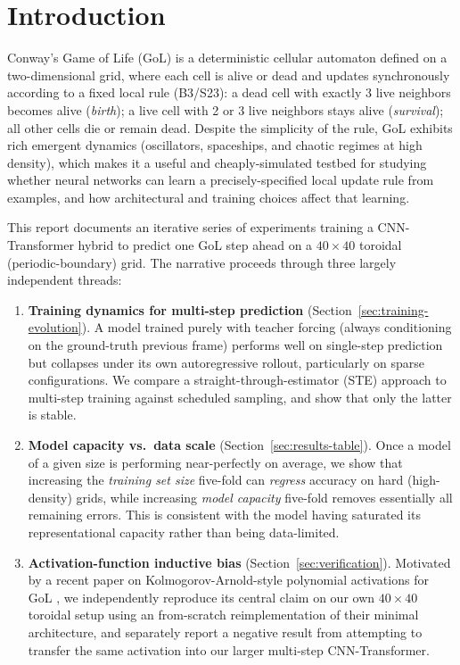 \section{Introduction}

Conway's Game of Life (GoL) is a deterministic cellular automaton defined on
a two-dimensional grid, where each cell is alive or dead and updates
synchronously according to a fixed local rule (B3/S23): a dead cell with
exactly 3 live neighbors becomes alive (\emph{birth}); a live cell with 2 or
3 live neighbors stays alive (\emph{survival}); all other cells die or
remain dead. Despite the simplicity of the rule, GoL exhibits rich emergent
dynamics (oscillators, spaceships, and chaotic regimes at high density),
which makes it a useful and cheaply-simulated testbed for studying whether
neural networks can learn a precisely-specified local update rule from
examples, and how architectural and training choices affect that learning.

This report documents an iterative series of experiments training a
CNN-Transformer hybrid to predict one GoL step ahead on a $40\times 40$
toroidal (periodic-boundary) grid. The narrative proceeds through three
largely independent threads:

\begin{enumerate}
  \item \textbf{Training dynamics for multi-step prediction}
  (Section~\ref{sec:training-evolution}). A model trained purely with
  teacher forcing (always conditioning on the ground-truth previous frame)
  performs well on single-step prediction but collapses under its own
  autoregressive rollout, particularly on sparse configurations. We compare
  a straight-through-estimator (STE) approach to multi-step training against
  scheduled sampling, and show that only the latter is stable.

  \item \textbf{Model capacity vs.\ data scale}
  (Section~\ref{sec:results-table}). Once a model of a given size is
  performing near-perfectly on average, we show that increasing the
  \emph{training set size} five-fold can \emph{regress} accuracy on hard
  (high-density) grids, while increasing \emph{model capacity} five-fold
  removes essentially all remaining errors. This is consistent with the
  model having saturated its representational capacity rather than being
  data-limited.

  \item \textbf{Activation-function inductive bias}
  (Section~\ref{sec:verification}). Motivated by a recent paper on
  Kolmogorov-Arnold-style polynomial activations for GoL
  \cite{ahmed2026polynomial}, we independently reproduce its central claim
  on our own $40\times 40$ toroidal setup using an from-scratch
  reimplementation of their minimal architecture, and separately report a
  negative result from attempting to transfer the same activation into our
  larger multi-step CNN-Transformer.
\end{enumerate}

